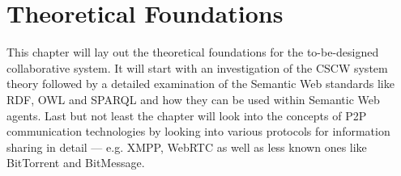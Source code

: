 
\chapter{Theoretical Foundations} %
\label{cha:theoretical_foundations}

This chapter will lay out the theoretical foundations for the to-be-designed collaborative system.
It will start with an investigation of the \gls{CSCW} system theory followed by a detailed examination of the
Semantic Web standards like \gls{RDF}, \gls{OWL} and \gls{SPARQL} and how they can be used within Semantic Web agents.
Last but not least the chapter will look into the concepts of \gls{P2P} communication technologies by looking into various
protocols for information sharing in detail --- e.g. \gls{XMPP}, \gls{WebRTC} as well as less known ones like BitTorrent and BitMessage.







